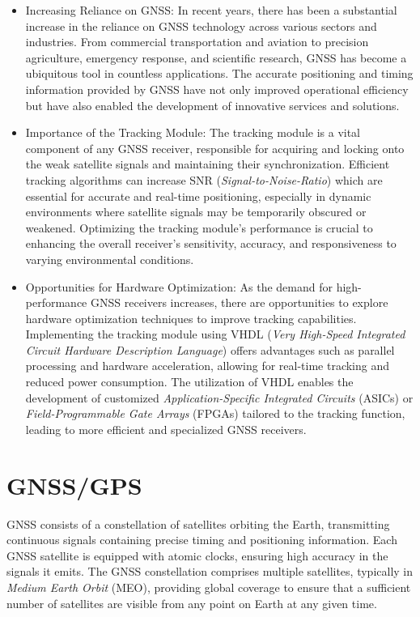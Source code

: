 \begin{itemize}
    \item Increasing Reliance on GNSS: In recent years, there has been a substantial increase in the reliance on GNSS technology across various sectors and industries. From commercial transportation and aviation to precision agriculture, emergency response, and scientific research, GNSS has become a ubiquitous tool in countless applications. The accurate positioning and timing information provided by GNSS have not only improved operational efficiency but have also enabled the development of innovative services and solutions.
    \item Importance of the Tracking Module: The tracking module is a vital component of any GNSS receiver, responsible for acquiring and locking onto the weak satellite signals and maintaining their synchronization. Efficient tracking algorithms can increase SNR (\textit{Signal-to-Noise-Ratio}) which are essential for accurate and real-time positioning, especially in dynamic environments where satellite signals may be temporarily obscured or weakened. Optimizing the tracking module's performance is crucial to enhancing the overall receiver's sensitivity, accuracy, and responsiveness to varying environmental conditions.
    \item Opportunities for Hardware Optimization: As the demand for high-performance GNSS receivers increases, there are opportunities to explore hardware optimization techniques to improve tracking capabilities. Implementing the tracking module using VHDL (\textit{Very High-Speed Integrated Circuit Hardware Description Language}) offers advantages such as parallel processing and hardware acceleration, allowing for real-time tracking and reduced power consumption. The utilization of VHDL enables the development of customized \textit{Application-Specific Integrated Circuits} (ASICs) or \textit{Field-Programmable Gate Arrays} (FPGAs) tailored to the tracking function, leading to more efficient and specialized GNSS receivers.
\end{itemize}

\section{GNSS/GPS}
GNSS consists of a constellation of satellites orbiting the Earth, transmitting continuous signals containing precise timing and positioning information. Each GNSS satellite is equipped with atomic clocks, ensuring high accuracy in the signals it emits. The GNSS constellation comprises multiple satellites, typically in \textit{Medium Earth Orbit} (MEO), providing global coverage to ensure that a sufficient number of satellites are visible from any point on Earth at any given time.

